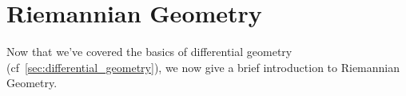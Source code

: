 \section{Riemannian Geometry}
\label{sec:riemannian_geometry}

Now that we've covered the basics of differential geometry (cf~\ref{sec:differential_geometry}), we now give a brief introduction to Riemannian Geometry.
